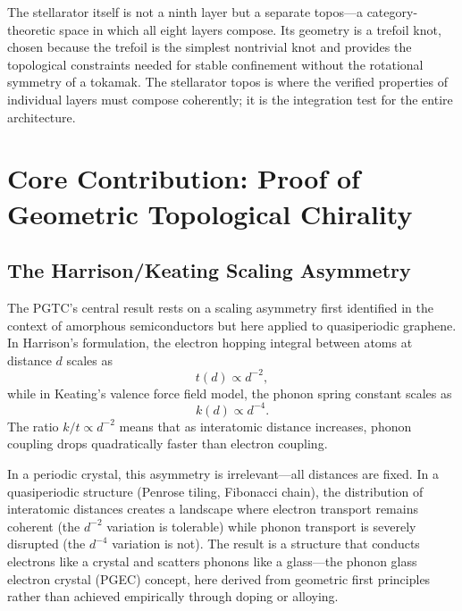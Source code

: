 \documentclass[12pt,letterpaper]{report}
\begin{document}
The stellarator itself is not a ninth layer but a separate topos---a category-theoretic space in which all eight layers compose. Its geometry is a trefoil knot, chosen because the trefoil is the simplest nontrivial knot and provides the topological constraints needed for stable confinement without the rotational symmetry of a tokamak. The stellarator topos is where the verified properties of individual layers must compose coherently; it is the integration test for the entire architecture.



\chapter{Core Contribution: Proof of Geometric Topological Chirality}
\label{ch:pgtc}

\section{The Harrison/Keating Scaling Asymmetry}

The PGTC's central result rests on a scaling asymmetry first identified in the context of amorphous semiconductors but here applied to quasiperiodic graphene. In Harrison's formulation, the electron hopping integral between atoms at distance $d$ scales as
\begin{equation}
t(d) \propto d^{-2},
\end{equation}
while in Keating's valence force field model, the phonon spring constant scales as
\begin{equation}
k(d) \propto d^{-4}.
\end{equation}
The ratio $k/t \propto d^{-2}$ means that as interatomic distance increases, phonon coupling drops quadratically faster than electron coupling.

In a periodic crystal, this asymmetry is irrelevant---all distances are fixed. In a quasiperiodic structure (Penrose tiling, Fibonacci chain), the distribution of interatomic distances creates a landscape where electron transport remains coherent (the $d^{-2}$ variation is tolerable) while phonon transport is severely disrupted (the $d^{-4}$ variation is not). The result is a structure that conducts electrons like a crystal and scatters phonons like a glass---the phonon glass electron crystal (PGEC) concept, here derived from geometric first principles rather than achieved empirically through doping or alloying.
\end{document}

